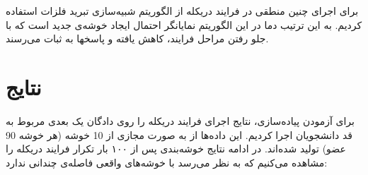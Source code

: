\documentclass{article}
\begin{document}
برای اجرای چنین منطقی در فرایند دریکله از الگوریتم شبیه‌سازی تبرید فلزات استفاده کردیم. به این ترتیب دما در این الگوریتم نمایانگر احتمال ایجاد خوشه‌ی جدید است که با جلو رفتن مراحل فرایند، کاهش یافته و پاسخها به ثبات می‌رسند.

\section{نتایج}
برای آزمودن پیاده‌سازی، نتایج اجرای فرایند دریکله را روی دادگان یک بعدی مربوط به قد دانشجویان اجرا کردیم. این داده‌ها از به صورت مجازی از 10 خوشه (هر خوشه 90 عضو) تولید شده‌اند. در ادامه نتایج خوشه‌بندی پس از ۱۰۰ بار تکرار فرایند دریکله را مشاهده می‌کنیم که به نظر می‌رسد با خوشه‌های واقعی فاصله‌ی چندانی ندارد:
\\
\end{document}
